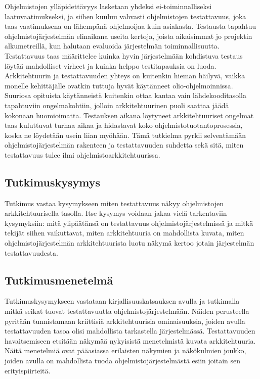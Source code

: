 \documentclass[finnish]{tktltiki2}
\numberwithin{table}{section}
\theoremstyle{definition}
\theoremstyle{remark}
\begin{document}
Ohjelmistojen ylläpidettävyys lasketaan yhdeksi ei-toiminnalliseksi laatuvaatimukseksi, ja siihen kuuluu vahvasti ohjelmistojen testattavuus, joka taas vaatimuksena on lähempänä ohjelmoijaa kuin asiakasta. Testausta tapahtuu ohjelmistojärjestelmän elinaikana useita kertoja, joista  aikaisimmat jo projektin alkumetreillä, kun halutaan evaluoida järjestelmän toiminnallisuutta. Testattavuus taas määrittelee kuinka hyvin järjestelmään kohdistuva testaus löytää mahdolliset virheet ja kuinka helppo testitapauksia on luoda. Arkkitehtuurin ja testattavuuden yhteys on kuitenkin hieman häilyvä, vaikka monelle kehittäjälle ovatkin tuttuja hyvät käytänneet olio-ohjelmoinnissa. Suuriosa opituista käytänneistä kuitenkin ottaa kantaa vain lähdekooditasolla tapahtuviin ongelmakohtiin, jolloin arkkitehtuurinen puoli saattaa jäädä kokonaan huomioimatta. Testauksen aikana löytyneet arkkitehtuuriset ongelmat taas kuluttuvat turhaa aikaa ja hidastavat koko ohjelmistotuotantoprosessia, koska ne löydetään usein liian myöhään. Tämä tutkielma pyrkii selventämään ohjelmistojärjestelmän rakenteen ja testattavuuden suhdetta sekä sitä, miten testattavuus tulee ilmi ohjelmistoarkkitehtuurissa. 

\subsection{Tutkimuskysymys}
Tutkimus vastaa kysymykseen miten testattavuus näkyy ohjelmistojen arkkitehtuurisella tasolla. Itse kysymys voidaan jakaa vielä tarkentaviin kysymyksiin: mitä ylipäätänsä on testattavuus ohjelmistojärjestelmissä ja mitkä tekijät siihen vaikuttavat, miten arkkitehtuuria on mahdollista kuvata, miten ohjelmistojärjestelmän arkkitehtuurista luotu näkymä kertoo jotain järjestelmän testattavuudesta. 

\subsection{Tutkimusmenetelmä}
Tutkimuskysymykseen vastataan kirjallisuuskatsauksen avulla ja tutkimalla mitkä seikat tuovat testattavuutta ohjelmistojärjestelmään. Näiden perusteella pyritään tunnistamaan kriittisiä arkkitehtuurisia ominaisuuksia, joiden avulla testattavuuden tasoa olisi mahdollista tarkastella järjestelmässä. Testattavuuden havaitsemiseen etsitään näkymää nykyisistä menetelmistä kuvata arkkitehtuuria. Näitä menetelmiä ovat pääasiassa erilaisten näkymien ja näkökulmien joukko, joiden avulla on mahdollista tuoda ohjelmistojärjestelmästä esiin joitain sen erityispiirteitä.
\end{document}

